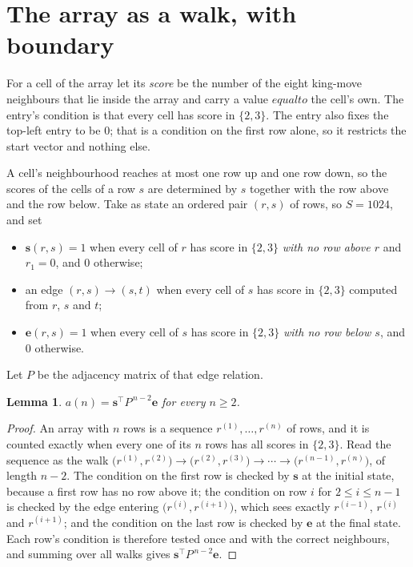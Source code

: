\documentclass[11pt,a4paper]{article}
\theoremstyle{plain}
\newtheorem{lemma}[theorem]{Lemma}
\theoremstyle{definition}
\begin{document}
\section{The array as a walk, with boundary}

For a cell of the array let its \emph{score} be the number of the eight king-move neighbours that lie inside
the array and carry a value $equal to$ the cell's own. The entry's condition is that every cell
has score in $\{2,3\}$. The entry also fixes the top-left entry to be $0$; that is a condition on the first row alone, so it restricts the start vector and nothing else.

A cell's neighbourhood reaches at most one row up and one row down, so the scores of the
cells of a row $s$ are determined by $s$ together with the row above and the row below.
Take as state an ordered pair $(r,s)$ of rows, so $S=1024$, and set
\begin{itemize}
\item $\mathbf{s}(r,s)=1$ when every cell of $r$ has score in $\{2,3\}$ \emph{with no row
above $r$} and $r_1=0$, and $0$ otherwise;
\item an edge $(r,s)\to(s,t)$ when every cell of $s$ has score in $\{2,3\}$ computed from
$r$, $s$ and $t$;
\item $\mathbf{e}(r,s)=1$ when every cell of $s$ has score in $\{2,3\}$ \emph{with no row
below $s$}, and $0$ otherwise.
\end{itemize}
Let $P$ be the adjacency matrix of that edge relation.

\begin{lemma}\label{lem:walk}
$a(n)=\mathbf{s}^{\!\top}P^{\,n-2}\mathbf{e}$ for every $n\ge2$.
\end{lemma}

\begin{proof}
An array with $n$ rows is a sequence $r^{(1)},\dots,r^{(n)}$ of rows, and it is counted
exactly when every one of its $n$ rows has all scores in $\{2,3\}$. Read the sequence as the
walk $\bigl(r^{(1)},r^{(2)}\bigr)\to\bigl(r^{(2)},r^{(3)}\bigr)\to\cdots\to
\bigl(r^{(n-1)},r^{(n)}\bigr)$, of length $n-2$. The condition on the first row is
checked by $\mathbf{s}$ at the initial state, because a first row has no row above it; the
condition on row $i$ for $2\le i\le n-1$ is checked by the edge entering
$\bigl(r^{(i)},r^{(i+1)}\bigr)$, which sees exactly $r^{(i-1)}$, $r^{(i)}$ and
$r^{(i+1)}$; and the condition on the last row is checked by $\mathbf{e}$ at the final
state. Each row's condition is therefore tested once and with the correct neighbours, and
summing over all walks gives $\mathbf{s}^{\!\top}P^{\,n-2}\mathbf{e}$.
\end{proof}
\end{document}
